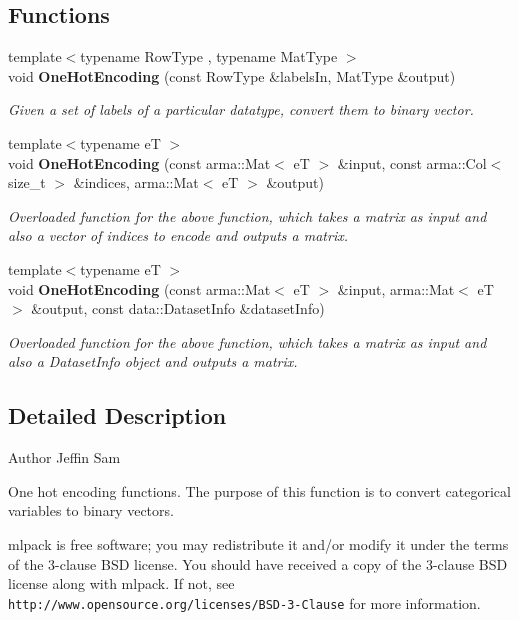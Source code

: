 \subsection*{Functions}
\begin{DoxyCompactItemize}
\item 
{\footnotesize template$<$typename Row\+Type , typename Mat\+Type $>$ }\\void \textbf{ One\+Hot\+Encoding} (const Row\+Type \&labels\+In, Mat\+Type \&output)
\begin{DoxyCompactList}\small\item\em Given a set of labels of a particular datatype, convert them to binary vector. \end{DoxyCompactList}\item 
{\footnotesize template$<$typename eT $>$ }\\void \textbf{ One\+Hot\+Encoding} (const arma\+::\+Mat$<$ eT $>$ \&input, const arma\+::\+Col$<$ size\+\_\+t $>$ \&indices, arma\+::\+Mat$<$ eT $>$ \&output)
\begin{DoxyCompactList}\small\item\em Overloaded function for the above function, which takes a matrix as input and also a vector of indices to encode and outputs a matrix. \end{DoxyCompactList}\item 
{\footnotesize template$<$typename eT $>$ }\\void \textbf{ One\+Hot\+Encoding} (const arma\+::\+Mat$<$ eT $>$ \&input, arma\+::\+Mat$<$ eT $>$ \&output, const data\+::\+Dataset\+Info \&dataset\+Info)
\begin{DoxyCompactList}\small\item\em Overloaded function for the above function, which takes a matrix as input and also a Dataset\+Info object and outputs a matrix. \end{DoxyCompactList}\end{DoxyCompactItemize}


\subsection{Detailed Description}
\begin{DoxyAuthor}{Author}
Jeffin Sam
\end{DoxyAuthor}
One hot encoding functions. The purpose of this function is to convert categorical variables to binary vectors.

mlpack is free software; you may redistribute it and/or modify it under the terms of the 3-\/clause B\+SD license. You should have received a copy of the 3-\/clause B\+SD license along with mlpack. If not, see {\tt http\+://www.\+opensource.\+org/licenses/\+B\+S\+D-\/3-\/\+Clause} for more information. 
